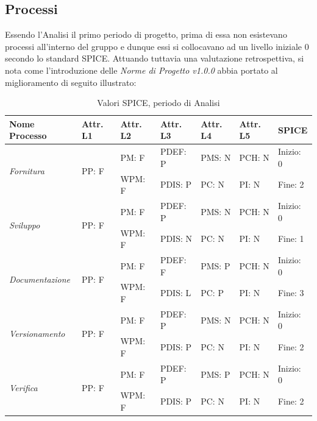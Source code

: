 \documentclass[openany,12pt,a4paper]{report}
\begin{document}
\subsection{Processi}

Essendo l'Analisi il primo periodo di progetto, prima di essa non esistevano processi all'interno del gruppo e dunque essi si collocavano ad un livello iniziale 0 secondo lo standard SPICE. Attuando tuttavia una valutazione retrospettiva, si nota come l'introduzione delle \textit{Norme di Progetto v1.0.0} abbia portato al miglioramento di seguito illustrato:

\begin{table}[h]
	\begin{center}
		\setlength\LTleft{-22mm}
		\begin{longtable}{|p{35mm}|p{20mm}|p{20mm}|p{20mm}|p{20mm}|p{20mm}|p{20mm}|}
			\hline
			\textbf{Nome Processo} & \textbf{Attr. L1} & \textbf{Attr. L2} & \textbf{Attr. L3} & \textbf{Attr. L4} & \textbf{Attr. L5} & \textbf{SPICE}\\
			\hline
			\multirow{2}{*}{\textit{Fornitura}} & \multirow{2}{*}{PP: F} & PM: F & PDEF: P & PMS: N & PCH: N & Inizio: 0\\  
			\cline{3-7}
			&          & WPM: F & PDIS: P & PC: N & PI: N & Fine: 2 \\ 
			\hline
			\multirow{2}{*}{\textit{Sviluppo}} & \multirow{2}{*}{PP: F} & PM: F & PDEF: P & PMS: N & PCH: N & Inizio: 0\\  \cline{3-7}
			&          & WPM: F & PDIS: N & PC: N & PI: N & Fine: 1\\
			\hline\multirow{2}{*}{\textit{Documentazione}} & \multirow{2}{*}{PP: F} & PM: F & PDEF: F & PMS: P & PCH: N & Inizio: 0\\  \cline{3-7}
			&          & WPM: F & PDIS: L & PC: P & PI: N & Fine: 3\\ 
			\hline\multirow{2}{*}{\textit{Versionamento}} & \multirow{2}{*}{PP: F} & PM: F & PDEF: P & PMS: N & PCH: N & Inizio: 0\\  \cline{3-7}
			&          & WPM: F & PDIS: P & PC: N & PI: N & Fine: 2\\ 
			\hline\multirow{2}{*}{\textit{Verifica}} & \multirow{2}{*}{PP: F} & PM: F & PDEF: P & PMS: P & PCH: N & Inizio: 0\\  \cline{3-7}
			&          & WPM: F & PDIS: P & PC: N & PI: N & Fine: 2\\ 
			\hline       
		\end{longtable}
	\end{center}
	\caption{Valori SPICE, periodo di Analisi} 
\end{table}
\end{document}
